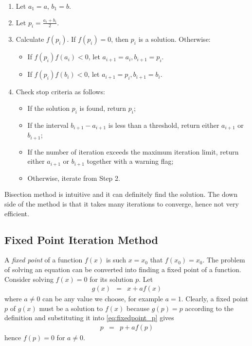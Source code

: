 \begin{enumerate}
\item Let $a_1 = a$, $b_1=b$.
\item Let $p_i = \frac{a_i+b_i}{2}$.
\item Calculate $f(p_i)$. If $f(p_i)=0$, then $p_i$ is a solution. Otherwise:
\begin{itemize}
  \item If $f(p_i)f(a_i) < 0$, let $a_{i+1}=a_i, b_{i+1}=p_i$.
  \item If $f(p_i)f(b_i) < 0$, let $a_{i+1}=p_i, b_{i+1}=b_i$.
\end{itemize}
\item Check stop criteria as follows:
\begin{itemize}
  \item If the solution $p_i$ is found, return $p_i$;
  \item If the interval $b_{i+1}-a_{i+1}$ is less than a threshold, return either $a_{i+1}$ or $b_{i+1}$;
  \item If the number of iteration exceeds the maximum iteration limit, return either $a_{i+1}$ or $b_{i+1}$ together with a warning flag;
  \item Otherwise, iterate from Step 2. 
\end{itemize}
\end{enumerate}

Bisection method is intuitive and it can definitely find the solution. The down side of the method is that it takes many iterations to converge, hence not very efficient.

\subsection{Fixed Point Iteration Method}

A \textit{fixed point} of a function $f(x)$ is such $x=x_0$ that $f(x_0)=x_0$. The problem of solving an equation can be converted into finding a fixed point of a function. Consider solving $f(x)=0$ for its solution $p$. Let
\begin{eqnarray}
  g(x) &=& x + af(x) \label{eq:fixedpoint_p}
\end{eqnarray}
where $a\neq 0$ can be any value we choose, for example $a=1$. Clearly, a fixed point $p$ of $g(x)$ must be a solution to $f(x)$ because $g(p)=p$ according to the definition and substituting it into \eqref{eq:fixedpoint_p} gives
\begin{eqnarray}
  p &=& p + af(p)
\end{eqnarray}
hence $f(p)=0$ for $a\neq 0$.


